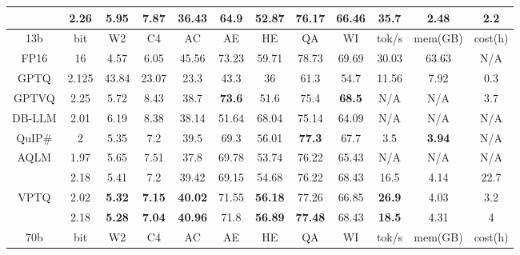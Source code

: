 \begin{table}[tbh!]
{\begin{tabular}{c|cccccccc|ccc}
       & 2.26  & \textbf{5.95 }         & \textbf{7.87}          & \textbf{36.43} & 64.9           & \textbf{52.87} & \textbf{76.17} & \textbf{66.46} & \textbf{35.7} & 2.48           & 2.2     \\ \hline
13b    & bit   & W2            & C4            & AC             & AE             & HE             & QA             & WI             & tok/s         & mem(GB)        & cost(h) \\ \hline
FP16   & 16    & 4.57          & 6.05          & 45.56          & 73.23          & 59.71          & 78.73          & 69.69          & 30.03         & 63.63          & N/A     \\
GPTQ   & 2.125 & 43.84         & 23.07         & 23.3           & 43.3           & 36             & 61.3           & 54.7           & 11.56         & 7.92           & 0.3     \\
GPTVQ  & 2.25  & 5.72          & 8.43          & 38.7           & \textbf{73.6}  & 51.6           & 75.4           & \textbf{68.5}  & N/A           & N/A            & 3.7     \\
DB-LLM & 2.01  & 6.19          & 8.38          & 38.14          & 51.64          & 68.04          & 75.14          & 64.09          & N/A           & N/A            & N/A     \\
QuIP\#\footnotemark[1] & 2     & 5.35          & 7.2           & 39.5           & 69.3           & 56.01          & \textbf{77.3}  & 67.7           & 3.5           & \textbf{3.94}           & N/A     \\
AQLM\footnotemark[1]   & 1.97  & 5.65          & 7.51          & 37.8           & 69.78          & 53.74          & 76.22          & 65.43          & N/A           & N/A            & N/A     \\
       & 2.18  & 5.41          & 7.2           & 39.42          & 69.15          & 54.68          & 76.22          & 68.43          & 16.5          & 4.14           & 22.7    \\
VPTQ   & 2.02  & \textbf{5.32} & \textbf{7.15} & \textbf{40.02} & 71.55          & \textbf{56.18} & 77.26          & 66.85          & \textbf{26.9} & 4.03           & 3.2     \\
       & 2.18  & \textbf{5.28} & \textbf{7.04} & \textbf{40.96} & 71.8           & \textbf{56.89} & \textbf{77.48} & 68.43          & \textbf{18.5} & 4.31           & 4       \\ \hline
70b    & bit   & W2            & C4            & AC             & AE             & HE             & QA             & WI             & tok/s         & mem(GB)        & cost(h)  \\ \hline

\end{tabular}}
\end{table}
